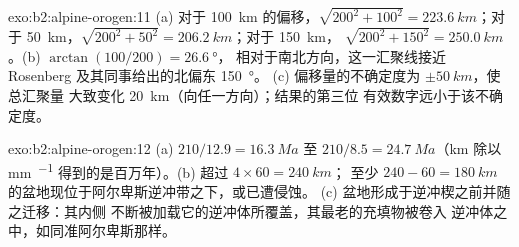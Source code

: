 \begin{solution}{exo:b2:alpine-orogen:11}
(a) 对于 \qty{100}{km} 的偏移，$\sqrt{200^2 + 100^2} = \qty{223.6}{km}$；对于
\qty{50}{km}，$\sqrt{200^2 + 50^2} = \qty{206.2}{km}$；对于 \qty{150}{km}，
$\sqrt{200^2 + 150^2} = \qty{250.0}{km}$。(b) $\arctan(100/200) = \qty{26.6}{\degree}$，
相对于南北方向，这一汇聚线接近 Rosenberg 及其同事给出的北偏东 \qty{150}{\degree}。
(c) 偏移量的不确定度为 $\pm\qty{50}{km}$，使总汇聚量
大致变化 \qty{20}{km}（向任一方向）；结果的第三位
有效数字远小于该不确定度。
\end{solution}

\begin{solution}{exo:b2:alpine-orogen:12}
(a) $210/12.9 = \qty{16.3}{Ma}$ 至 $210/8.5 = \qty{24.7}{Ma}$（\unit{km} 除以
\unit{mm.^{-1}} 得到的是百万年）。(b) 超过 $4\times60 = \qty{240}{km}$；
至少 $240 - 60 = \qty{180}{km}$ 的盆地现位于阿尔卑斯逆冲带之下，或已遭侵蚀。
(c) 盆地形成于逆冲楔之前并随之迁移：其内侧
不断被加载它的逆冲体所覆盖，其最老的充填物被卷入
逆冲体之中，如同准阿尔卑斯那样。
\end{solution}

